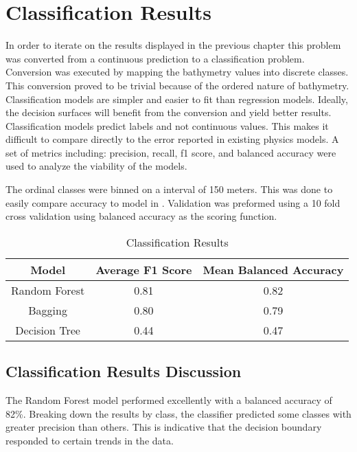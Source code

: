 \section{Classification Results}
\setlength{\parindent}{10ex}
In order to iterate on the results displayed in the previous chapter this problem was converted from a continuous prediction to a classification problem.
Conversion was executed by mapping the bathymetry values into discrete classes.
This conversion proved to be trivial because of the ordered nature of bathymetry.
Classification models are simpler and easier to fit than regression models.
Ideally, the decision surfaces will benefit from the conversion and yield better results.
Classification models predict labels and not continuous values.
This makes it difficult to compare directly to the error reported in existing physics models.
A set of metrics including: precision, recall, f1 score, and balanced accuracy were used to analyze the viability of the models.

\par
The ordinal classes were binned on a interval of 150 meters.
This was done to easily compare accuracy to model in \cite{jena2012prediction}.
Validation was preformed using a 10 fold cross validation using balanced accuracy as the scoring function.

\begin{table}[htb]
    \centering
    \begin{tabular}{|c c c|}
        \hline
		\textbf{Model} & \textbf{Average F1 Score} & \textbf{Mean Balanced Accuracy} \\
		\hline
		Random Forest & 0.81 & 0.82 \\
        Bagging & 0.80 & 0.79 \\
        Decision Tree & 0.44 & 0.47 \\
        \hline
    \end{tabular}
    \label{table:CLASSIFICATION_RESULTS}
    \caption{Classification Results}
\end{table}

\subsection{Classification Results Discussion}
The Random Forest model performed excellently with a balanced accuracy of 82\%.
Breaking down the results by class, the classifier predicted some classes with greater precision than others.
This is indicative that the decision boundary responded to certain trends in the data.

